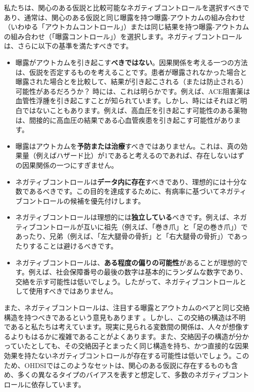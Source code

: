 \documentclass[
  11pt]{book}
\theoremstyle{definition}
\theoremstyle{definition}
\theoremstyle{definition}
\theoremstyle{definition}
\theoremstyle{remark}
\begin{document}
私たちは、関心のある仮説と比較可能なネガティブコントロールを選択すべきであり、通常は、関心のある仮説と同じ曝露を持つ曝露-アウトカムの組み合わせ（いわゆる「アウトカムコントロール」）または同じ結果を持つ曝露-アウトカムの組み合わせ（「曝露コントロール」）を選択します。ネガティブコントロールは、さらに以下の基準を満たすべきです。

\begin{itemize}
\item
  曝露がアウトカムを引き起こす\textbf{べきではない}。因果関係を考える一つの方法は、仮説を否定するものを考えることです。患者が曝露されなかった場合と曝露された場合とを比較して、結果が引き起こされる（または防止される）可能性があるだろうか？ 時には、これは明らかです。例えば、ACE阻害薬は血管性浮腫を引き起こすことが知られています。しかし、時にはそれほど明白ではないこともあります。例えば、高血圧を引き起こす可能性のある薬物は、間接的に高血圧の結果である心血管疾患を引き起こす可能性があります。
\item
  曝露はアウトカムを\textbf{予防または治療}すべきではありません。これは、真の効果量（例えばハザード比）が1であると考えるのであれば、存在しないはずの因果関係の一つにすぎません。
\item
  ネガティブコントロールは\textbf{データ内に存在}すべきであり、理想的には十分な数であるべきです。この目的を達成するために、有病率に基づいてネガティブコントロールの候補を優先付けします。
\item
  ネガティブコントロールは理想的には\textbf{独立している}べきです。例えば、ネガティブコントロールが互いに祖先（例えば、「巻き爪」と「足の巻き爪」）であったり、兄弟（例えば、「左大腿骨の骨折」と「右大腿骨の骨折」）であったりすることは避けるべきです。
\item
  ネガティブコントロールは、\textbf{ある程度の偏りの可能性}があることが理想的です。例えば、社会保障番号の最後の数字は基本的にランダムな数字であり、交絡を示す可能性は低いでしょう。したがって、ネガティブコントロールとして使用すべきではありません。
\end{itemize}

また、ネガティブコントロールは、注目する曝露とアウトカムのペアと同じ交絡構造を持つべきであるという意見もあります \citep{lipsitch_2010}。しかし、この交絡の構造は不明であると私たちは考えています。現実に見られる変数間の関係は、人々が想像するよりもはるかに複雑であることがよくあります。また、交絡因子の構造が分かっていたとしても、その交絡因子とまったく同じ構造を持ち、かつ直接的な因果効果を持たないネガティブコントロールが存在する可能性は低いでしょう。このため、OHDSIではこのようなセットは、関心のある仮説に存在するものも含め、多くの異なるタイプのバイアスを表すと想定して、多数のネガティブコントロールに依存しています。
\end{document}
